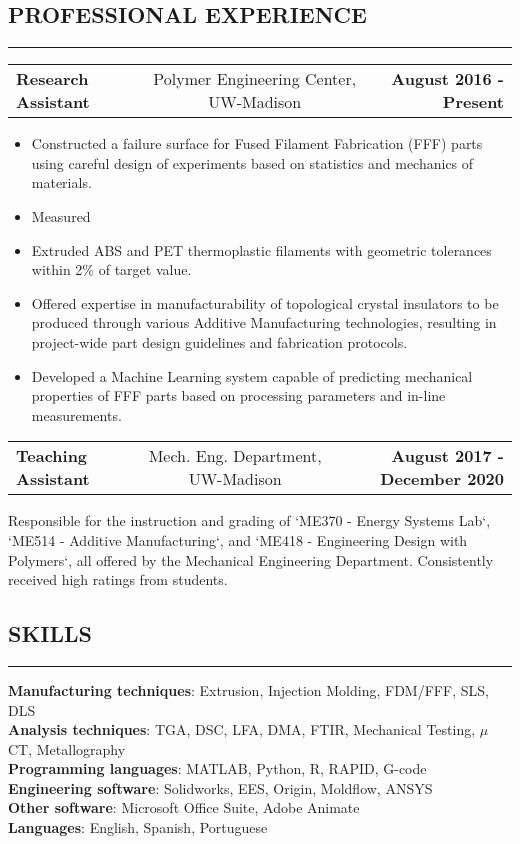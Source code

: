 \documentclass[11pt,letterpaper]{article}
\makeatletter
\newcommand{\headerrow}[3]
{\vspace{0.4em}
\noindent
\begin{tabular*}{\textwidth}{l @{\extracolsep{\fill}} cr}
	\textbf{#1} & %
	#2 &		  %
	\textbf{#3}\\ %
\end{tabular*}}
\makeatother
\begin{document}
\subsection*{PROFESSIONAL EXPERIENCE}
	\vspace{-0.5em}
	\hrule

	\headerrow
		{Research Assistant}
		{Polymer Engineering Center, UW-Madison}
		{August 2016 - Present}
		
	\begin{itemize}
		
		\item Constructed a failure surface for Fused Filament Fabrication (FFF) parts using careful design of experiments based on statistics and mechanics of materials.
		\item Measured 
		\item Extruded ABS and PET thermoplastic filaments with geometric tolerances within 2\% of target value. 
		\item Offered expertise in manufacturability of topological crystal insulators to be produced through various Additive Manufacturing technologies, resulting in project-wide part design guidelines and fabrication protocols. 
		\item Developed a Machine Learning system capable of predicting mechanical properties of FFF parts based on processing parameters and in-line measurements.

	\end{itemize}

	\headerrow
	{Teaching Assistant}
	{Mech. Eng. Department, UW-Madison} 
	{August 2017 - December 2020}
	Responsible for the instruction and grading of `ME370 - Energy Systems Lab`, `ME514 - Additive Manufacturing`, and `ME418 - Engineering Design with Polymers`, all offered by the Mechanical Engineering Department. Consistently received high ratings from students.

\subsection*{SKILLS}
\vspace{-0.5em}
\hrule
\vspace{0.4em}

\textbf{Manufacturing techniques}: Extrusion, Injection Molding, FDM/FFF, SLS, DLS\\
\textbf{Analysis techniques}: TGA, DSC, LFA, DMA, FTIR, Mechanical Testing, $\mu$CT, Metallography\\
\textbf{Programming languages}: MATLAB, Python, R, RAPID, G-code\\
\textbf{Engineering software}: Solidworks, EES, Origin, Moldflow, ANSYS\\
\textbf{Other software}: Microsoft Office Suite, Adobe Animate\\
\textbf{Languages}: English, Spanish, Portuguese\\
\end{document}
